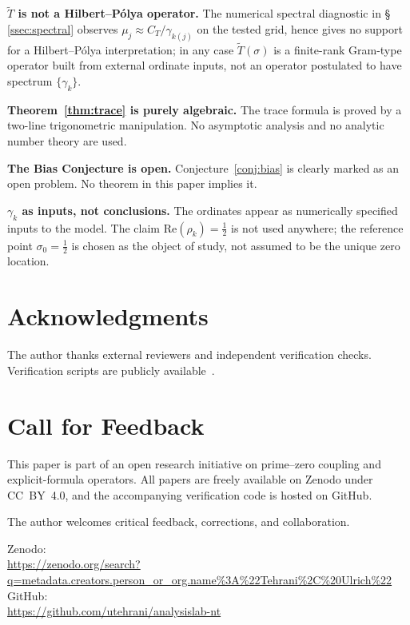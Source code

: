 \documentclass[11pt]{article}
\newcommand{\Tt}{\widetilde{T}}
\newcommand{\CT}{C_{T}}
\begin{document}
\textbf{$\Tt$ is not a Hilbert--P\'olya operator.}
The numerical spectral diagnostic in \S\,\ref{ssec:spectral}
observes $\mu_j\approx\CT/\gamma_{k(j)}$ on the tested grid, hence
gives no support for a Hilbert--P\'olya interpretation; in any case
$\Tt(\sigma)$ is a finite-rank Gram-type operator built from external
ordinate inputs, not an operator postulated to have spectrum
$\{\gamma_k\}$.

\textbf{Theorem~\ref{thm:trace} is purely algebraic.}
The trace formula is proved by a two-line trigonometric manipulation.
No asymptotic analysis and no analytic number theory are used.

\textbf{The Bias Conjecture is open.}
Conjecture~\ref{conj:bias} is clearly marked as an open problem.
No theorem in this paper implies it.

\textbf{$\gamma_k$ as inputs, not conclusions.}
The ordinates appear as numerically specified inputs to the model.
The claim $\mathrm{Re}(\rho_k)=\tfrac{1}{2}$ is not used anywhere;
the reference point $\sigma_0=\tfrac{1}{2}$ is chosen as the object
of study, not assumed to be the unique zero location.

\section*{Acknowledgments}

The author thanks external reviewers and
independent verification checks.
Verification scripts are publicly available~\cite{Code}.

\section*{Call for Feedback}

This paper is part of an open research initiative on prime--zero
coupling and explicit-formula operators.
All papers are freely available on Zenodo under CC~BY~4.0,
and the accompanying verification code is hosted on GitHub.

The author welcomes critical feedback, corrections, and collaboration.

{\raggedright
Zenodo:\\
\url{https://zenodo.org/search?q=metadata.creators.person_or_org.name\%3A\%22Tehrani\%2C\%20Ulrich\%22}\\
GitHub:\\
\url{https://github.com/utehrani/analysislab-nt}
\par}
\end{document}
